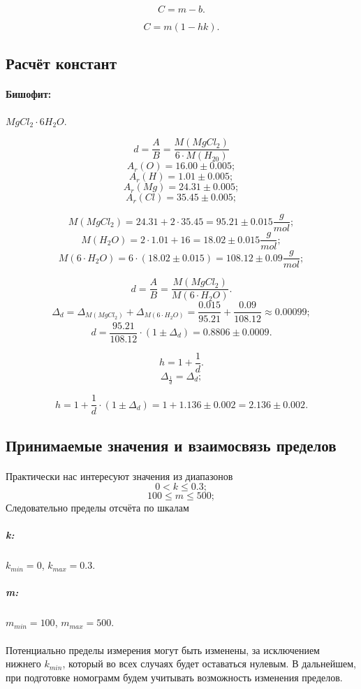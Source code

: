 $$C = m - b.$$

$$C = m (1 - h k).$$ 

\subsection{Расчёт констант}
\paragraph{Бишофит:} $MgCl_2 \cdot 6H_2O$.

$$d = \frac{A}{B} = \frac{M\left( MgCl_2 \right)}{6 \cdot M\left( H_20 \right)}$$
$$A_r\left( O \right) = 16.00 \pm 0.005;$$
$$A_r\left( H \right) = 1.01 \pm 0.005;$$
$$A_r\left( Mg \right) = 24.31 \pm 0.005;$$
$$A_r\left( Cl \right) = 35.45 \pm 0.005;$$

$$M\left( MgCl_2 \right) = 24.31 + 2 \cdot 35.45 = 95.21 \pm 0.015 \frac{g}{mol};$$
$$M\left( H_2O \right) = 2 \cdot 1.01 + 16 = 18.02 \pm 0.015 \frac{g}{mol};$$
$$M\left(6 \cdot H_2O \right) = 6 \cdot \left(18.02 \pm 0.015 \right) = 108.12 \pm 0.09 \frac{g}{mol};$$

$$d = \frac{A}{B} = \frac{M\left( MgCl_2 \right)}{M\left(6 \cdot H_2O \right)}.$$
$$\Delta_{d} 
	= \Delta_{M\left( MgCl_2 \right)} + \Delta_{M\left( 6 \cdot H_2O \right)} 
	= \frac{0.015}{95.21} + \frac{0.09}{108.12} 
	\approx 0.00099
;$$
$$d 
	= \frac{95.21}{108.12} \cdot \left( 1 \pm \Delta_d \right )
	= 0.8806 \pm 0.0009.
$$

$$h= 1 + \frac{1}{d}.$$
$$\Delta_\frac{1}{d} = \Delta_d;$$

$$h 
	= 1 + \frac{1}{d} \cdot \left( 1 \pm \Delta_d \right )
	= 1 + 1.136 \pm 0.002
	= 2.136 \pm 0.002.
$$

\subsection{Принимаемые значения и взаимосвязь пределов}
\paragraph{}Практически нас интересуют значения из диапазонов
$$0 < k \le 0.3;$$
$$100 \le m \le 500;$$
Следовательно пределы отсчёта по шкалам
\subparagraph{k:} $k_{min} = 0$, $k_{max} = 0.3$.
\subparagraph{m:} $m_{min} = 100$, $m_{max} = 500$.
\paragraph{}Потенциально пределы измерения могут быть изменены, за исключением нижнего $k_{min}$, который во всех случаях будет оставаться нулевым. В дальнейшем, при подготовке номограмм будем учитывать возможность изменения пределов.


